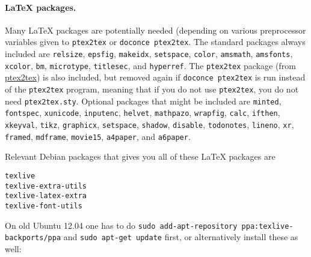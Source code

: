 \documentclass[%
oneside,                 %
final,                   %
10pt]{article}
\begin{document}
\paragraph{{\LaTeX} packages.}
Many {\LaTeX} packages are potentially needed (depending on various
preprocessor variables given to {\fontsize{10pt}{10pt}\Verb!ptex2tex!} or {\fontsize{10pt}{10pt}\Verb!doconce ptex2tex!}.  The
standard packages always included are {\fontsize{10pt}{10pt}\Verb!relsize!}, {\fontsize{10pt}{10pt}\Verb!epsfig!}, {\fontsize{10pt}{10pt}\Verb!makeidx!},
{\fontsize{10pt}{10pt}\Verb!setspace!}, {\fontsize{10pt}{10pt}\Verb!color!}, {\fontsize{10pt}{10pt}\Verb!amsmath!}, {\fontsize{10pt}{10pt}\Verb!amsfonts!}, {\fontsize{10pt}{10pt}\Verb!xcolor!}, {\fontsize{10pt}{10pt}\Verb!bm!},
{\fontsize{10pt}{10pt}\Verb!microtype!}, {\fontsize{10pt}{10pt}\Verb!titlesec!}, and {\fontsize{10pt}{10pt}\Verb!hyperref!}.  The {\fontsize{10pt}{10pt}\Verb!ptex2tex!} package (from
\href{{http://code.google.com/p/ptex2tex}}{ptex2tex}) is also included, but
removed again if {\fontsize{10pt}{10pt}\Verb!doconce ptex2tex!} is run instead of the {\fontsize{10pt}{10pt}\Verb!ptex2tex!}
program, meaning that if you do not use {\fontsize{10pt}{10pt}\Verb!ptex2tex!}, you do not need
{\fontsize{10pt}{10pt}\Verb!ptex2tex.sty!}. Optional packages that might be included are {\fontsize{10pt}{10pt}\Verb!minted!},
{\fontsize{10pt}{10pt}\Verb!fontspec!}, {\fontsize{10pt}{10pt}\Verb!xunicode!}, {\fontsize{10pt}{10pt}\Verb!inputenc!}, {\fontsize{10pt}{10pt}\Verb!helvet!}, {\fontsize{10pt}{10pt}\Verb!mathpazo!}, {\fontsize{10pt}{10pt}\Verb!wrapfig!},
{\fontsize{10pt}{10pt}\Verb!calc!}, {\fontsize{10pt}{10pt}\Verb!ifthen!}, {\fontsize{10pt}{10pt}\Verb!xkeyval!}, {\fontsize{10pt}{10pt}\Verb!tikz!}, {\fontsize{10pt}{10pt}\Verb!graphicx!}, {\fontsize{10pt}{10pt}\Verb!setspace!}, {\fontsize{10pt}{10pt}\Verb!shadow!},
{\fontsize{10pt}{10pt}\Verb!disable!}, {\fontsize{10pt}{10pt}\Verb!todonotes!}, {\fontsize{10pt}{10pt}\Verb!lineno!}, {\fontsize{10pt}{10pt}\Verb!xr!}, {\fontsize{10pt}{10pt}\Verb!framed!}, {\fontsize{10pt}{10pt}\Verb!mdframe!},
{\fontsize{10pt}{10pt}\Verb!movie15!}, {\fontsize{10pt}{10pt}\Verb!a4paper!}, and {\fontsize{10pt}{10pt}\Verb!a6paper!}.

Relevant Debian packages that gives you all of these {\LaTeX} packages are

\begin{Verbatim}[fontsize=\fontsize{9pt}{9pt},tabsize=8,baselinestretch=0.85,fontfamily=tt,xleftmargin=7mm]
texlive
texlive-extra-utils
texlive-latex-extra
texlive-font-utils
\end{Verbatim}
\noindent
On old Ubuntu 12.04 one has to do {\fontsize{10pt}{10pt}\Verb!sudo add-apt-repository ppa:texlive-backports/ppa!} and {\fontsize{10pt}{10pt}\Verb!sudo apt-get update!} first, or alternatively install these as well:
\end{document}
